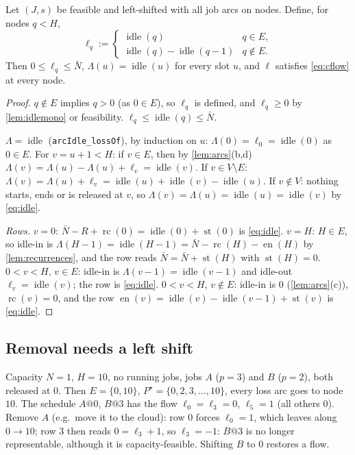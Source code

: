 \documentclass[11pt,a4paper]{article}
\newcommand{\Starts}{\operatorname{st}}
\newcommand{\Ends}{\operatorname{en}}
\newcommand{\Rc}{\operatorname{rc}}
\newcommand{\Idle}{\operatorname{idle}}
\newcommand{\lean}[1]{\texttt{\small #1}}
\begin{document}
\begin{theorem}[Completeness; \lean{complete}]\label{thm:complete}
Let $(J,s)$ be feasible and left-shifted with all job arcs on nodes. Define,
for nodes $q<H$,
\[
\ell_q:=\begin{cases}\Idle(q)&q\in E,\\ \Idle(q)-\Idle(q-1)&q\notin E.\end{cases}
\]
Then $0\le\ell_q\le\bar N$, $\Lambda(u)=\Idle(u)$ for every slot $u$, and
$\ell$ satisfies \eqref{eq:cflow} at every node.
\end{theorem}
\begin{proof}
$q\notin E$ implies $q>0$ (as $0\in E$), so $\ell_q$ is defined, and
$\ell_q\ge0$ by \cref{lem:idlemono} or feasibility. $\ell_q\le\Idle(q)\le\bar N$.

\emph{$\Lambda=\Idle$} (\lean{arcIdle\_lossOf}), by induction on $u$:
$\Lambda(0)=\ell_0=\Idle(0)$ as $0\in E$. For $v=u+1<H$: if $v\in E$, then by
\cref{lem:arcs}(b,d) $\Lambda(v)=\Lambda(u)-\Lambda(u)+\ell_v=\Idle(v)$. If
$v\in V\setminus E$: $\Lambda(v)=\Lambda(u)+\ell_v=\Idle(u)+\Idle(v)-\Idle(u)$.
If $v\notin V$: nothing starts, ends or is released at $v$, so
$\Lambda(v)=\Lambda(u)=\Idle(u)=\Idle(v)$ by \eqref{eq:idle}.

\emph{Rows.} $v=0$: $\bar N-R+\Rc(0)=\Idle(0)+\Starts(0)$ is \eqref{eq:idle}.
$v=H$: $H\in E$, so idle-in is $\Lambda(H-1)=\Idle(H-1)
=\bar N-\Rc(H)-\Ends(H)$ by \cref{lem:recurrences}, and the row reads
$\bar N=\bar N+\Starts(H)$ with $\Starts(H)=0$. $0<v<H$, $v\in E$: idle-in is
$\Lambda(v-1)=\Idle(v-1)$ and idle-out $\ell_v=\Idle(v)$; the row is
\eqref{eq:idle}. $0<v<H$, $v\notin E$: idle-in is $0$ (\cref{lem:arcs}(c)),
$\Rc(v)=0$, and the row $\Ends(v)=\Idle(v)-\Idle(v-1)+\Starts(v)$ is
\eqref{eq:idle}.
\end{proof}

\subsection{Removal needs a left shift}

\begin{example}\label{ex:removal}
Capacity $N=1$, $H=10$, no running jobs, jobs $A$ ($p=3$) and $B$ ($p=2$),
both released at $0$. Then $E=\{0,10\}$, $P^\star=\{0,2,3,\dots,10\}$, every
loss arc goes to node $10$. The schedule $A@0$, $B@3$ has the flow
$\ell_0=\ell_3=0$, $\ell_5=1$ (all others $0$). Remove $A$ (e.g.\ move it to
the cloud): row $0$ forces $\ell_0=1$, which leaves along $0\to10$; row $3$
then reads $0=\ell_3+1$, so $\ell_3=-1$: $B@3$ is no longer representable,
although it is capacity-feasible. Shifting $B$ to $0$ restores a flow.
\end{example}
\end{document}
